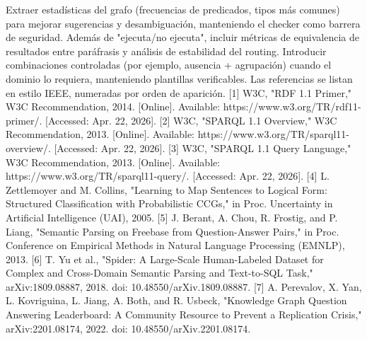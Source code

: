\markdownRendererUlItem {} Extraer estadísticas del grafo (frecuencias de predicados, tipos más comunes) para mejorar sugerencias y desambiguación, manteniendo el checker como barrera de seguridad.\markdownRendererUlItemEnd 
\markdownRendererUlItem {} Además de "ejecuta/no ejecuta", incluir métricas de equivalencia de resultados entre paráfrasis y análisis de estabilidad del routing.\markdownRendererUlItemEnd 
\markdownRendererUlItem {} Introducir combinaciones controladas (por ejemplo, ausencia + agrupación) cuando el dominio lo requiera, manteniendo plantillas verificables.\markdownRendererUlItemEnd 
\markdownRendererUlEndTight \markdownRendererInterblockSeparator
{}\markdownRendererHorizontalRule{}\markdownRendererInterblockSeparator
{}\markdownRendererInterblockSeparator
{}Las referencias se listan en estilo IEEE, numeradas por orden de aparición.\markdownRendererInterblockSeparator
{}[1] W3C, "RDF 1.1 Primer," W3C Recommendation, 2014. [Online]. Available: https://www.w3.org/TR/rdf11-primer/. [Accessed: Apr. 22, 2026].\markdownRendererInterblockSeparator
{}[2] W3C, "SPARQL 1.1 Overview," W3C Recommendation, 2013. [Online]. Available: https://www.w3.org/TR/sparql11-overview/. [Accessed: Apr. 22, 2026].\markdownRendererInterblockSeparator
{}[3] W3C, "SPARQL 1.1 Query Language," W3C Recommendation, 2013. [Online]. Available: https://www.w3.org/TR/sparql11-query/. [Accessed: Apr. 22, 2026].\markdownRendererInterblockSeparator
{}[4] L. Zettlemoyer and M. Collins, "Learning to Map Sentences to Logical Form: Structured Classification with Probabilistic CCGs," in Proc. Uncertainty in Artificial Intelligence (UAI), 2005.\markdownRendererInterblockSeparator
{}[5] J. Berant, A. Chou, R. Frostig, and P. Liang, "Semantic Parsing on Freebase from Question-Answer Pairs," in Proc. Conference on Empirical Methods in Natural Language Processing (EMNLP), 2013.\markdownRendererInterblockSeparator
{}[6] T. Yu et al., "Spider: A Large-Scale Human-Labeled Dataset for Complex and Cross-Domain Semantic Parsing and Text-to-SQL Task," arXiv:1809.08887, 2018. doi: 10.48550/arXiv.1809.08887.\markdownRendererInterblockSeparator
{}[7] A. Perevalov, X. Yan, L. Kovriguina, L. Jiang, A. Both, and R. Usbeck, "Knowledge Graph Question Answering Leaderboard: A Community Resource to Prevent a Replication Crisis," arXiv:2201.08174, 2022. doi: 10.48550/arXiv.2201.08174.\markdownRendererInterblockSeparator
